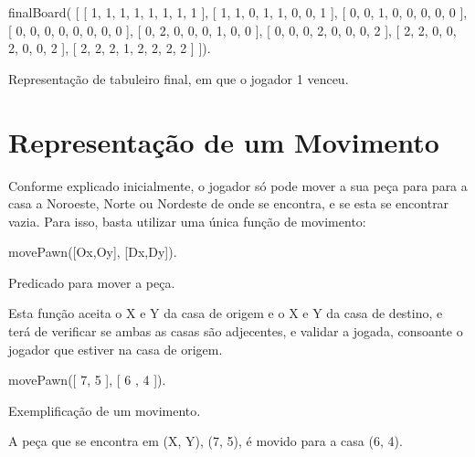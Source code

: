 \documentclass[15pt,a4paper]{article}
\begin{document}
\begin{code}[H]
	\begin{verbatimtab}

finalBoard(
	[
		[ 1, 1, 1, 1, 1, 1, 1, 1 ],
		[ 1, 1, 0, 1, 1, 0, 0, 1 ],
		[ 0, 0, 1, 0, 0, 0, 0, 0 ],
		[ 0, 0, 0, 0, 0, 0, 0, 0 ],
		[ 0, 2, 0, 0, 0, 1, 0, 0 ],
		[ 0, 0, 0, 2, 0, 0, 0, 2 ],
		[ 2, 2, 0, 0, 2, 0, 0, 2 ],
		[ 2, 2, 2, 1, 2, 2, 2, 2 ]
	]).
\end{verbatimtab}
\caption{Representação de tabuleiro final, em que o jogador 1 venceu.}
\end{code}



\section{Representação de um Movimento}


Conforme explicado inicialmente, o jogador só pode mover a sua peça para para a casa a Noroeste, Norte ou Nordeste de onde se encontra, e se esta se encontrar vazia. Para isso, basta utilizar uma única função de movimento:
\begin{code}[H]
	\begin{verbatimtab}

	movePawn([Ox,Oy], [Dx,Dy]).
\end{verbatimtab}
\caption{Predicado para mover a peça.}
\end{code}
Esta função aceita o X e Y da casa de origem e o X e Y da casa de destino, e terá de verificar se ambas as casas são adjecentes, e validar a jogada, consoante o jogador que estiver na casa de origem.

\begin{code}[H]
	\begin{verbatimtab}

	movePawn([ 7, 5 ], [ 6 , 4 ]).
\end{verbatimtab}
\caption{Exemplificação de um movimento.}
\end{code}
A peça que se encontra em (X, Y), (7, 5), é movido para a casa (6, 4).
\end{document}

